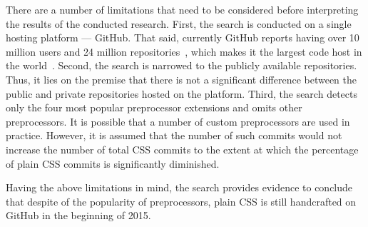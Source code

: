 There are a number of limitations that need to be considered before
interpreting the results of the conducted research. First, the search is
conducted on a single hosting platform --- GitHub. That said, currently GitHub
reports having over 10 million users and 24 million
repositories~\cite{GitHub}, which makes it the largest code host in the
world~\cite{gousios2014lean}. Second, the search is narrowed to the publicly
available repositories. Thus, it lies on the premise that there is not a
significant difference between the public and private repositories hosted on
the platform. Third, the search detects only the four most popular
preprocessor extensions and omits other preprocessors. It is possible that a
number of custom preprocessors are used in practice. However, it is assumed
that the number of such commits would not increase the number of total CSS
commits to the extent at which the percentage of plain CSS commits is
significantly diminished.

Having the above limitations in mind, the search provides evidence to conclude
that despite of the popularity of preprocessors, plain CSS is still
handcrafted on GitHub in the beginning of 2015.

